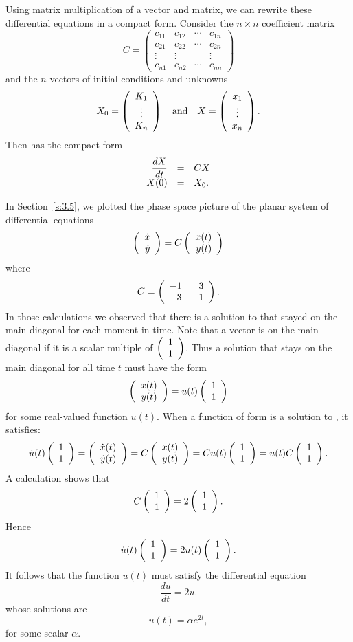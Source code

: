 Using matrix multiplication of a vector and matrix, we can rewrite these 
differential equations in a compact form.   Consider the $n\times n$ 
coefficient matrix
\[
C = \left(
\begin{array}{rrrr}
 c_{11} & c_{12} & \cdots & c_{1n} \\
 c_{21} & c_{22} & \cdots & c_{2n}  \\
 \vdots & \vdots &        & \vdots  \\
 c_{n1} & c_{n2} & \cdots & c_{nn}
\end{array}
\right)
\]
and the $n$ vectors of initial conditions and unknowns
\[
X_0=\left(
\begin{array}{ccc}
K_1 \\ \vdots  \\ K_n
\end{array}
\right) \quad\mbox{and}\quad
X=\left(
\begin{array}{ccc}
x_1 \\ \vdots  \\ x_n
\end{array}
\right).
\]
Then  has the compact form
\begin{equation}  \label{E:geneqn}
\begin{array}{rcl}
\displaystyle\frac{dX}{dt} & = & CX\\
X(0) & = & X_0.  
\end{array}
\end{equation}


In Section~\ref{s:3.5}, we plotted the phase space picture 
of the planar system of differential equations
\begin{equation} \label{-13}
\left(\begin{array}{r} \dot{x} \\ \dot{y}\end{array}\right)
= C \left(\begin{array}{r} x(t) \\ y(t)\end{array}\right)
\end{equation}
where
\[
C = \left(\begin{array}{rr} -1 & 3\\ 3 &-1\end{array}\right).
\]
In those calculations we observed that there is a solution to
 that stayed on the main diagonal for each moment in
time.  Note that a vector is on the main diagonal if it is a
scalar multiple of $\left(\begin{array}{r} 1 \\ 1\end{array}\right)$.  Thus a solution that stays
on the main diagonal for all time $t$ must have the form
\begin{equation} \label{e:diagform}
\left(\begin{array}{r} x(t) \\ y(t)\end{array}\right) = u(t) \left(\begin{array}{r} 1 \\ 1\end{array}\right)
\end{equation}
for some real-valued function $u(t)$.  When a function of form
 is a solution to , it satisfies:
\[
\dot{u}(t)\left(\begin{array}{r} 1 \\ 1\end{array}\right) = \left(\begin{array}{r} \dot{x}(t) \\ \dot{y}(t)\end{array}\right) =
C \left(\begin{array}{r} x(t) \\ y(t)\end{array}\right) = C u(t)\left(\begin{array}{r} 1 \\ 1\end{array}\right) = u(t) C \left(\begin{array}{r} 1 \\ 1\end{array}\right).
\]
A calculation shows that
\[
C \left(\begin{array}{r} 1 \\ 1\end{array}\right) = 2 \left(\begin{array}{r} 1 \\ 1\end{array}\right).
\]
Hence
\[
\dot{u}(t) \left(\begin{array}{r} 1 \\ 1\end{array}\right) =  2 u(t) \left(\begin{array}{r} 1 \\ 1\end{array}\right).
\]
It follows that the function $u(t)$ must satisfy the
differential equation
\[
\frac{du}{dt} = 2u.
\]
whose solutions are
\[
u(t) = \alpha e^{2t},
\]
for some scalar $\alpha$.

